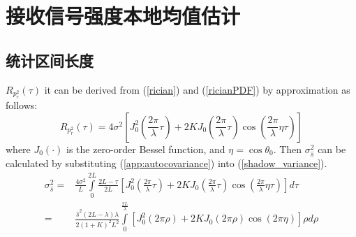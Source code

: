 
\chapter{接收信号强度本地均值估计}
\label{chap:meanestimation}

\section{统计区间长度}
\label{sec:lengthestimation}

$R_{p_{r}^2}(\tau)$ it can be derived from (\ref{rician}) and (\ref{ricianPDF}) by approximation\cite{Austin1994} as follows:
\begin{equation}
    R_{p_{r}^2}(\tau)=4\sigma^2\left[J_0^2\left(\frac{2\pi}{\lambda}\tau\right)+2KJ_0\left(\frac{2\pi}{\lambda}\tau\right)\cos\left(\frac{2\pi}{\lambda}\eta\tau\right)\right]
\label{app:autocovariance}
\end{equation}
where $J_0(\cdot)$ is the zero-order Bessel function, and $\eta=\cos\theta_0$. Then $\sigma_{\hat{s}}^2$ can be calculated by substituting (\ref{app:autocovariance}) into (\ref{shadow_variance}).
\begin{equation}
\begin{split}
\sigma_{\hat{s}}^{2}=&\frac{4\sigma^2}{L}\int\limits_{0}^{2L}\frac{2L-\tau}{2L}[J_0^2(\frac{2\pi}{\lambda}\tau)+2KJ_0(\frac{2\pi}{\lambda}\tau)\cos(\frac{2\pi}{\lambda}\eta\tau)]d\tau\\
=&\frac{\hat{s}^2(2L-\lambda)\lambda}{2(1+K)^{2}L^2}\int\limits_0^{\frac{2L}{\lambda}}[J_0^2(2\pi \rho)+2KJ_0(2\pi \rho)\cos(2\pi \eta)]\rho d\rho
\end{split}
\label{app:shadow_sigma}
\end{equation}
